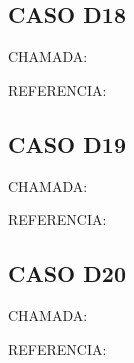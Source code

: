 \documentclass{undftex}
\begin{document}
\clearpage
\begin{refsection}
\section*{CASO D18}\noindent CHAMADA:
\par\noindent REFERENCIA:\par\printbibliography[heading=none]
\end{refsection}
\clearpage
\begin{refsection}
\section*{CASO D19}\noindent CHAMADA:
\par\noindent REFERENCIA:\par\printbibliography[heading=none]
\end{refsection}
\clearpage
\begin{refsection}
\section*{CASO D20}\noindent CHAMADA:
\par\noindent REFERENCIA:\par\printbibliography[heading=none]
\end{refsection}
\clearpage
\end{document}

